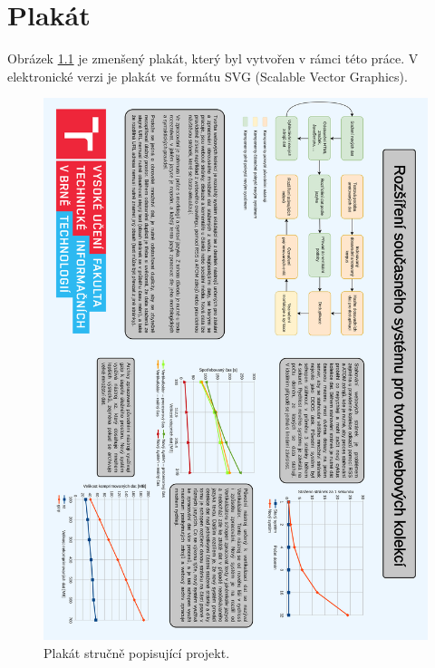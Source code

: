 \chapter{Plakát}
Obrázek \ref{plakat} je zmenšený plakát, který byl vytvořen v rámci této práce. V elektronické
verzi je plakát ve formátu SVG (Scalable Vector Graphics).
\begin{figure}[p]
    \label{plakat}
    \includegraphics[height=\paperwidth,width=\paperwidth,keepaspectratio]{obrazky-figures/plakat.png}
    \caption{Plakát stručně popisující projekt.}
\end{figure}